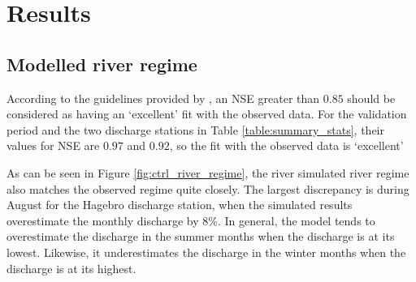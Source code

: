 \documentclass{article}
\begin{document}
\newpage
\section{Results}

\subsection{Modelled river regime}

According to the guidelines provided by \textcite{henriksen2008assessment}, an NSE greater than $0.85$ should be considered as having an `excellent' fit with the observed data. For the validation period and the two discharge stations in Table \ref{table:summary_stats}, their values for NSE are $0.97$ and $0.92$, so the fit with the observed data is `excellent'

\begin{table}[!h]
    \centering
\end{table}

As can be seen in Figure \ref{fig:ctrl_river_regime}, the river simulated river regime also matches the observed regime quite closely. The largest discrepancy is during August for the Hagebro discharge station, when the simulated results overestimate the monthly discharge by 8\%. In general, the model tends to overestimate the discharge in the summer months when the discharge is at its lowest. Likewise, it underestimates the discharge in the winter months when the discharge is at its highest.
\end{document}
